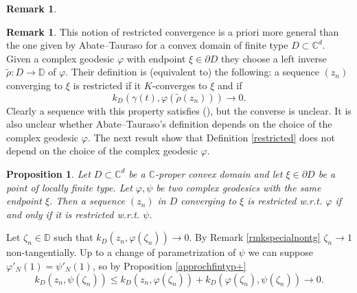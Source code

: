\documentclass[11pt, reqno]{amsart}
\numberwithin{equation}{section}
\newtheorem{proposition}[theorem]{Proposition}
\theoremstyle{definition}
\newtheorem{remark}[theorem]{Remark}
\newcommand{\C}{\mathbb{C}}
\newcommand{\D}{\mathbb{D}}
\begin{document}
{\begin{remark}
		\end{remark}
		\begin{remark}\label{rmkAbrestricted}
			This  notion of restricted convergence  is a priori more general than the one given by Abate--Tauraso \cite[Section 3]{AbTau} for a convex domain of finite type $D\subset \C^d$. Given  a complex geodesic $\varphi$  with endpoint $\xi\in\partial D$ they choose a  left inverse $\tilde \rho\colon D\to \D$ of $\varphi$. Their definition is (equivalent to) the following:
			a sequence $(z_n)$ converging to  $\xi$ is restricted if it $K$-converges to $\xi$ and if $$k_D(\gamma(t),\varphi(\tilde \rho(z_n)))\to0.$$ Clearly  a sequence with this property satisfies (), but the converse is unclear. It is also unclear whether Abate--Tauraso's definition depends on the choice of the complex geodesic $\varphi$. The next result show that  Definition \ref{restricted} does not depend on the choice of the complex geodesic $\varphi$.
		\end{remark}
		\begin{proposition}
			Let $D\subset\C^d$ be a $\C$-proper convex domain and let $\xi\in\partial D$ be a point of locally finite type.
			Let $\varphi,\psi$ be two complex geodesics with the same endpoint $\xi$.
			Then a sequence $(z_n)$ in $D$ converging to $\xi$ is restricted w.r.t. $\varphi$ if and only if it is restricted w.r.t. $\psi$.
		\end{proposition}
		\proof
		Let $\zeta_n\in\D$ such that $k_D(z_n,\varphi(\zeta_n))\to 0$. By Remark \ref{rmkspecialnontg} $\zeta_n\to1$ non-tangentially. Up to a change of parametrization of $\psi$ we can suppose $\varphi'_N(1)=\psi'_N(1)$, so by Proposition \ref{approchfintyp+}
		$$k_D(z_n,\psi(\zeta_n))\leq k_D(z_n,\varphi(\zeta_n))+k_D(\varphi(\zeta_n),\psi(\zeta_n))\to 0.$$
		\endproof
		
		
		
		
		
		
		
}
\end{document}
